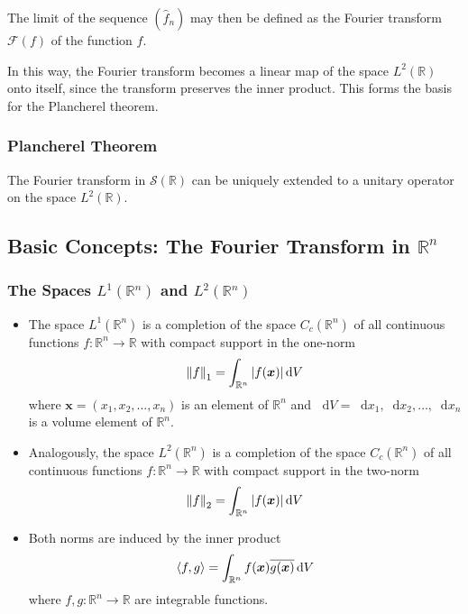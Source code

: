 \documentclass[11pt, a4paper]{article}
\newcommand{\diff}{\mathop{}\!\mathrm{d}} %
\newcommand{\R}{\mathbb{R}} %
\begin{document}
The limit of the sequence $ (\widehat{f}_n) $ may then be defined as the Fourier transform $ \mathcal{F}(f) $ of the function $ f $.

In this way, the Fourier transform becomes a linear map of the space $ L^{2}(\R) $ onto itself, since the transform preserves the inner product. This forms the basis for the Plancherel theorem.

\subsubsection{Plancherel Theorem}
The Fourier transform in $ \mathcal{S}(\R) $ can be uniquely extended to a unitary operator on the space $ L^{2}(\R) $.


\subsection{Basic Concepts: The Fourier Transform in $ \R^n $}

\subsubsection{The Spaces $ L^{1}(\R^n) $ and $ L^{2}(\R^n) $ }
\begin{itemize}
	\item The space $ L^1(\R^n) $ is a completion of the space $ C_c(\R^n) $ of all continuous functions $ f:\R^n \to \R $ with compact support in the one-norm 
	\begin{equation*}
		\norm{f}_{1} = \int_{\R^n} \abs{f(\bm{x})} \diff V
	\end{equation*}
	where $ \bm{x} = (x_1, x_2, \dots, x_n) $ is an element of $ \R^n $ and $ \diff V = \diff x_1, \diff x_2, \dots, \diff x_n $ is a volume element of $ \R^n $.
	
	\item Analogously, the space $ L^2(\R^n) $ is a completion of the space $ C_c(\R^n) $ of all continuous functions $ f:\R^n \to \R $  with compact support in the two-norm 
	\begin{equation*}
		\norm{f}_{2} = \int_{\R^n} \abs{f(\bm{x})} \diff V
	\end{equation*}

	\item Both norms are induced by the inner product 
	\begin{align*}
		\expval{f, g} = \int_{\R^n} f(\bm{x})\overline{g(\bm{x})} \diff V
	\end{align*}
	where $ f, g: \R^n \to \R$ are integrable functions.
\end{itemize}
\end{document}
